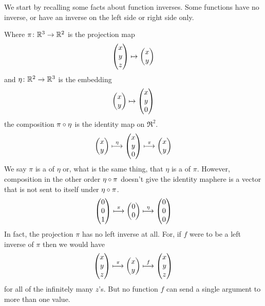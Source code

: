 We start by recalling some facts about function 
inverses.  %
Some functions have no inverse, or have an inverse on the left side 
or right side only.

\begin{example}  \label{ex:ProjLeftInvOfEmbed}
Where 
\( \mbox{$\pi\colon \mathbb{R}^3\to \mathbb{R}^2$} \) is the projection map 
\begin{equation*}
  \begin{pmatrix} x \\ y \\ z \end{pmatrix}
    \mapsto
  \begin{pmatrix} x \\ y \end{pmatrix}
\end{equation*}
and \( \mbox{$\eta\colon \mathbb{R}^2\to \mathbb{R}^3$} \) is the embedding  
\begin{equation*}
  \begin{pmatrix} x \\ y \end{pmatrix}
    \mapsto
  \begin{pmatrix} x \\ y \\ 0 \end{pmatrix}
\end{equation*}
the composition $\pi\mathbin\circ \eta$ is the identity map on $\Re^2$.
\begin{equation*}
  \begin{pmatrix} x \\ y \end{pmatrix}
    \stackrel{\eta}{\longmapsto}
  \begin{pmatrix} x \\ y \\ 0 \end{pmatrix}
    \stackrel{\pi}{\longmapsto}
  \begin{pmatrix} x \\ y \end{pmatrix}
\end{equation*}
We say $\pi$ is a  
of $\eta$ or, what is the same thing, 
that $\eta$ is a  
of $\pi$.
However, composition in the other order $\eta\mathbin\circ \pi$ 
doesn't give the identity map\Dash here is a vector that is not 
sent to itself under $\eta\mathbin\circ \pi$. 
\begin{equation*}
  \begin{pmatrix} 0 \\ 0 \\ 1 \end{pmatrix}
    \stackrel{\pi}{\longmapsto}
  \begin{pmatrix} 0 \\ 0 \end{pmatrix}
    \stackrel{\eta}{\longmapsto}
  \begin{pmatrix} 0 \\ 0 \\ 0 \end{pmatrix}
\end{equation*}
In fact, the projection
$\pi$ has no left inverse at all.
For, if $f$ were to be a left inverse of $\pi$
then we would have
\begin{equation*}
  \begin{pmatrix} x \\ y \\ z \end{pmatrix}
    \stackrel{\pi}{\longmapsto}
  \begin{pmatrix} x \\ y \end{pmatrix}
    \stackrel{f}{\longmapsto}
  \begin{pmatrix} x \\ y \\ z \end{pmatrix}
\end{equation*}
for all of the infinitely many $z$'s.
But no function $f$ can send a single argument to more than one value.
\end{example}

